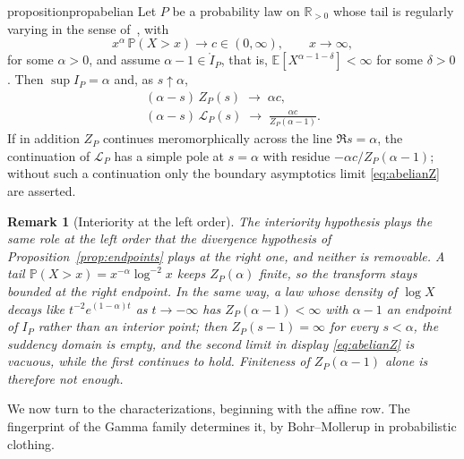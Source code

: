 \documentclass[sn-mathphys-num]{sn-jnl}
\theoremstyle{thmstyleone}%
\theoremstyle{thmstyletwo}%
\newtheorem{remark}{Remark}%
\theoremstyle{thmstylethree}%
\theoremstyle{thmstyleone}%
\providecommand{\E}{\mathbb{E}}
\providecommand{\Prob}{\mathbb{P}}
\providecommand{\Rpos}{\mathbb{R}_{>0}}
\providecommand{\Leh}{\mathscr{L}}
\begin{document}
	\begin{restatable}{proposition}{propabelian}
		\label{prop:abelian}
		Let $P$ be a probability law on $\Rpos$ whose tail is regularly
		varying in the sense of~\cite{bgt1987}, with
		\begin{equation}\label{eq:regvar}
			x^{\alpha}\,\Prob(X>x)\longrightarrow c\in(0,\infty),
			\qquad x\to\infty,
		\end{equation}
		for some $\alpha>0$, and assume $\alpha-1\in\mathring I_P$,
		that is, $\E[X^{\alpha-1-\delta}]<\infty$ for some
		$\delta>0$. Then
		$\sup I_P=\alpha$ and, as $s\uparrow\alpha$,
		\begin{equation}\label{eq:abelianZ}
			\begin{gathered}
				(\alpha-s)\,Z_P(s)\;\longrightarrow\;\alpha c,\\
				(\alpha-s)\,\Leh_P(s)\;\longrightarrow\;
				\frac{\alpha c}{Z_P(\alpha-1)} .
			\end{gathered}
		\end{equation}
		If in addition $Z_P$ continues meromorphically across the line
		$\Re s=\alpha$, the continuation of $\Leh_P$ has a simple pole at
		$s=\alpha$ with residue $-\alpha c/Z_P(\alpha-1)$; without such a
		continuation only the boundary asymptotics limit \eqref{eq:abelianZ} are
		asserted.
	\end{restatable}
	
	\begin{remark}[Interiority at the left order]\label{rem:abelianinterior}
		The interiority hypothesis plays the same role at the left
		order that the divergence hypothesis of
		Proposition~\ref{prop:endpoints} plays at the right one, and
		neither is removable. A tail
		$\Prob(X>x)=x^{-\alpha}\log^{-2}x$ keeps $Z_P(\alpha)$
		finite, so the transform stays bounded at the right endpoint.
		In the same way, a law whose density of $\log X$ decays like
		$t^{-2}e^{(1-\alpha)t}$ as $t\to-\infty$ has
		$Z_P(\alpha-1)<\infty$ with $\alpha-1$ an endpoint of $I_P$
		rather than an interior point; then $Z_P(s-1)=\infty$ for
		every $s<\alpha$, the suddency domain is empty, and the second
		limit in display \eqref{eq:abelianZ} is vacuous, while the
		first continues to hold. Finiteness of $Z_P(\alpha-1)$ alone
		is therefore not enough.
	\end{remark}
	
	We now turn to the characterizations, beginning with the affine row.
	The fingerprint of the Gamma family determines it, by Bohr--Mollerup
	in probabilistic clothing.
	
\end{document}

